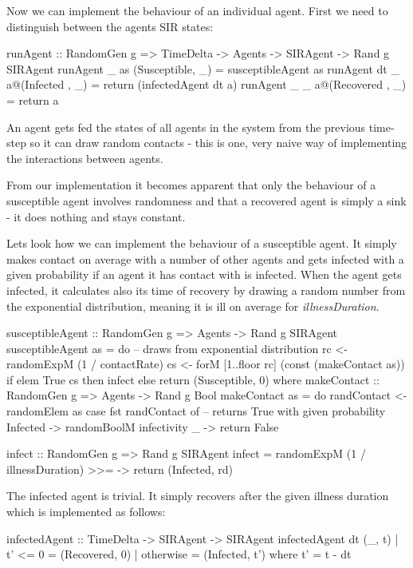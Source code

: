 Now we can implement the behaviour of an individual agent. First we need to distinguish between the agents SIR states:

\begin{HaskellCode}
runAgent :: RandomGen g 
  => TimeDelta -> Agents -> SIRAgent -> Rand g SIRAgent
runAgent _  as   (Susceptible, _) = susceptibleAgent as
runAgent dt _  a@(Infected   , _) = return (infectedAgent dt a)
runAgent _  _  a@(Recovered  , _) = return a
\end{HaskellCode}

An agent gets fed the states of all agents in the system from the previous time-step so it can draw random contacts - this is one, very naive way of implementing the interactions between agents.

From our implementation it becomes apparent that only the behaviour of a susceptible agent involves randomness and that a recovered agent is simply a sink - it does nothing and stays constant.

Lets look how we can implement the behaviour of a susceptible agent. It simply makes contact on average with a number of other agents and gets infected with a given probability if an agent it has contact with is infected.
When the agent gets infected, it calculates also its time of recovery by drawing a random number from the exponential distribution, meaning it is ill on average for \textit{illnessDuration}.

\begin{HaskellCode}
susceptibleAgent :: RandomGen g => Agents -> Rand g SIRAgent
susceptibleAgent as = do
    -- draws from exponential distribution
    rc <- randomExpM (1 / contactRate) 
    cs <- forM [1..floor rc] (const (makeContact as))
    if elem True cs
      then infect
      else return (Susceptible, 0)
  where
    makeContact :: RandomGen g => Agents -> Rand g Bool
    makeContact as = do
      randContact <- randomElem as
      case fst randContact of
        -- returns True with given probability 
        Infected -> randomBoolM infectivity 
        _        -> return False

    infect :: RandomGen g => Rand g SIRAgent
    infect = randomExpM (1 / illnessDuration) 
               >>= \rd -> return (Infected, rd)
\end{HaskellCode}

The infected agent is trivial. It simply recovers after the given illness duration which is implemented as follows:

\begin{HaskellCode}
infectedAgent :: TimeDelta -> SIRAgent -> SIRAgent
infectedAgent dt (_, t) 
    | t' <= 0   = (Recovered, 0)
    | otherwise = (Infected, t')
  where
    t' = t - dt  
\end{HaskellCode}

